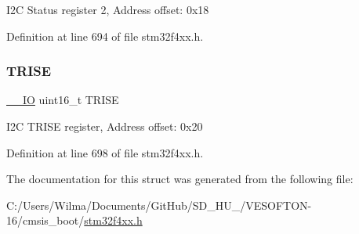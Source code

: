 I2C Status register 2, Address offset\+: 0x18 

Definition at line 694 of file stm32f4xx.\+h.

\mbox{\label{struct_i2_c___type_def_a7fbb70132ee565bb179078b6ee20cc2b}} 
\subsubsection{\texorpdfstring{T\+R\+I\+SE}{TRISE}}
{\footnotesize\ttfamily \hyperlink{group___c_m_s_i_s__core__definitions_gaec43007d9998a0a0e01faede4133d6be}{\+\_\+\+\_\+\+IO} uint16\+\_\+t T\+R\+I\+SE}

I2C T\+R\+I\+SE register, Address offset\+: 0x20 

Definition at line 698 of file stm32f4xx.\+h.



The documentation for this struct was generated from the following file\+:\begin{DoxyCompactItemize}
\item 
C\+:/\+Users/\+Wilma/\+Documents/\+Git\+Hub/\+S\+D\+\_\+\+H\+U\+\_/\+V\+E\+S\+O\+F\+T\+O\+N-\/16/cmsis\+\_\+boot/\hyperlink{stm32f4xx_8h}{stm32f4xx.\+h}\end{DoxyCompactItemize}
